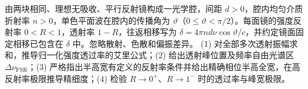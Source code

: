 由两块相同、理想无吸收、平行反射镜构成一光学腔，间距 \(d>0\)，腔内均匀介质折射率 \(n>0\)，单色平面波在腔内的传播角为 \(\vartheta\)（\(0\le\vartheta<\pi/2\)）。每面镜的强度反射率 \(0<R<1\)，透射率 \(1-R\)，往返相移写为 \(\delta=4\pi nd\nu\cos\vartheta/c\)，并约定镜面固定相移已包含在 \(\delta\) 中。忽略散射、色散和偏振差异。
(1) 对全部多次透射振幅求和，推导归一化强度透过率的艾里公式；(2) 给出透射峰位置及频率自由光谱区 \(\Delta\nu_{\mathrm{FSR}}\)；(3) 严格指出半高宽有定义的反射率条件并给出精确相位半高全宽，在高反射率极限推导精细度；(4) 检验 \(R\to0^+\)、\(R\to1^-\) 时的透过率与峰宽极限。
